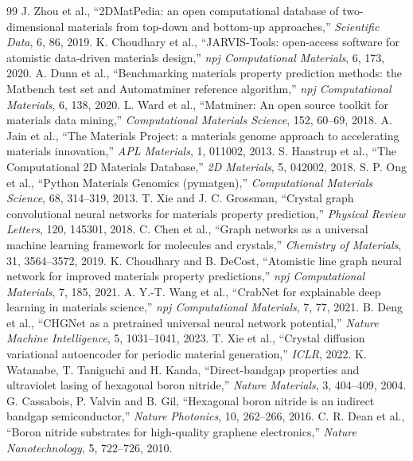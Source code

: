 \documentclass[10pt,a4paper]{article}
\begin{document}
\begin{thebibliography}{99}
\setlength{\itemsep}{-1pt}
 J. Zhou et al., ``2DMatPedia: an open computational database of two-dimensional materials from top-down and bottom-up approaches,'' \textit{Scientific Data}, 6, 86, 2019.
 K. Choudhary et al., ``JARVIS-Tools: open-access software for atomistic data-driven materials design,'' \textit{npj Computational Materials}, 6, 173, 2020.
 A. Dunn et al., ``Benchmarking materials property prediction methods: the Matbench test set and Automatminer reference algorithm,'' \textit{npj Computational Materials}, 6, 138, 2020.
 L. Ward et al., ``Matminer: An open source toolkit for materials data mining,'' \textit{Computational Materials Science}, 152, 60--69, 2018.
 A. Jain et al., ``The Materials Project: a materials genome approach to accelerating materials innovation,'' \textit{APL Materials}, 1, 011002, 2013.
 S. Haastrup et al., ``The Computational 2D Materials Database,'' \textit{2D Materials}, 5, 042002, 2018.
 S. P. Ong et al., ``Python Materials Genomics (pymatgen),'' \textit{Computational Materials Science}, 68, 314--319, 2013.
 T. Xie and J. C. Grossman, ``Crystal graph convolutional neural networks for materials property prediction,'' \textit{Physical Review Letters}, 120, 145301, 2018.
 C. Chen et al., ``Graph networks as a universal machine learning framework for molecules and crystals,'' \textit{Chemistry of Materials}, 31, 3564--3572, 2019.
 K. Choudhary and B. DeCost, ``Atomistic line graph neural network for improved materials property predictions,'' \textit{npj Computational Materials}, 7, 185, 2021.
 A. Y.-T. Wang et al., ``CrabNet for explainable deep learning in materials science,'' \textit{npj Computational Materials}, 7, 77, 2021.
 B. Deng et al., ``CHGNet as a pretrained universal neural network potential,'' \textit{Nature Machine Intelligence}, 5, 1031--1041, 2023.
 T. Xie et al., ``Crystal diffusion variational autoencoder for periodic material generation,'' \textit{ICLR}, 2022.
 K. Watanabe, T. Taniguchi and H. Kanda, ``Direct-bandgap properties and ultraviolet lasing of hexagonal boron nitride,'' \textit{Nature Materials}, 3, 404--409, 2004.
 G. Cassabois, P. Valvin and B. Gil, ``Hexagonal boron nitride is an indirect bandgap semiconductor,'' \textit{Nature Photonics}, 10, 262--266, 2016.
 C. R. Dean et al., ``Boron nitride substrates for high-quality graphene electronics,'' \textit{Nature Nanotechnology}, 5, 722--726, 2010.
\end{thebibliography}
\normalsize
\end{document}
